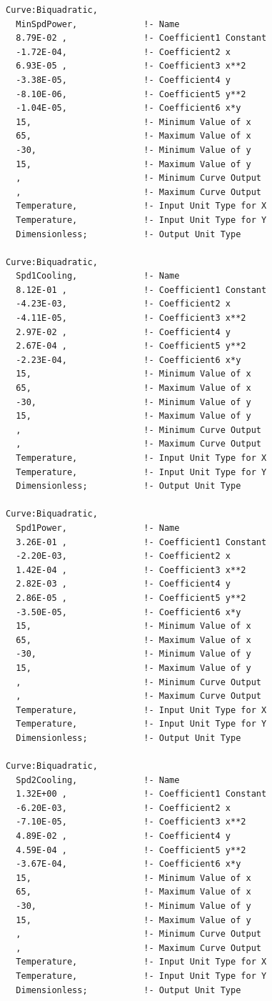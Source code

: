 \begin{lstlisting}
Curve:Biquadratic,
  MinSpdPower,             !- Name
  8.79E-02 ,               !- Coefficient1 Constant
  -1.72E-04,               !- Coefficient2 x
  6.93E-05 ,               !- Coefficient3 x**2
  -3.38E-05,               !- Coefficient4 y
  -8.10E-06,               !- Coefficient5 y**2
  -1.04E-05,               !- Coefficient6 x*y
  15,                      !- Minimum Value of x
  65,                      !- Maximum Value of x
  -30,                     !- Minimum Value of y
  15,                      !- Maximum Value of y
  ,                        !- Minimum Curve Output
  ,                        !- Maximum Curve Output
  Temperature,             !- Input Unit Type for X
  Temperature,             !- Input Unit Type for Y
  Dimensionless;           !- Output Unit Type

Curve:Biquadratic,
  Spd1Cooling,             !- Name
  8.12E-01 ,               !- Coefficient1 Constant
  -4.23E-03,               !- Coefficient2 x
  -4.11E-05,               !- Coefficient3 x**2
  2.97E-02 ,               !- Coefficient4 y
  2.67E-04 ,               !- Coefficient5 y**2
  -2.23E-04,               !- Coefficient6 x*y
  15,                      !- Minimum Value of x
  65,                      !- Maximum Value of x
  -30,                     !- Minimum Value of y
  15,                      !- Maximum Value of y
  ,                        !- Minimum Curve Output
  ,                        !- Maximum Curve Output
  Temperature,             !- Input Unit Type for X
  Temperature,             !- Input Unit Type for Y
  Dimensionless;           !- Output Unit Type

Curve:Biquadratic,
  Spd1Power,               !- Name
  3.26E-01 ,               !- Coefficient1 Constant
  -2.20E-03,               !- Coefficient2 x
  1.42E-04 ,               !- Coefficient3 x**2
  2.82E-03 ,               !- Coefficient4 y
  2.86E-05 ,               !- Coefficient5 y**2
  -3.50E-05,               !- Coefficient6 x*y
  15,                      !- Minimum Value of x
  65,                      !- Maximum Value of x
  -30,                     !- Minimum Value of y
  15,                      !- Maximum Value of y
  ,                        !- Minimum Curve Output
  ,                        !- Maximum Curve Output
  Temperature,             !- Input Unit Type for X
  Temperature,             !- Input Unit Type for Y
  Dimensionless;           !- Output Unit Type

Curve:Biquadratic,
  Spd2Cooling,             !- Name
  1.32E+00 ,               !- Coefficient1 Constant
  -6.20E-03,               !- Coefficient2 x
  -7.10E-05,               !- Coefficient3 x**2
  4.89E-02 ,               !- Coefficient4 y
  4.59E-04 ,               !- Coefficient5 y**2
  -3.67E-04,               !- Coefficient6 x*y
  15,                      !- Minimum Value of x
  65,                      !- Maximum Value of x
  -30,                     !- Minimum Value of y
  15,                      !- Maximum Value of y
  ,                        !- Minimum Curve Output
  ,                        !- Maximum Curve Output
  Temperature,             !- Input Unit Type for X
  Temperature,             !- Input Unit Type for Y
  Dimensionless;           !- Output Unit Type


\end{lstlisting}
